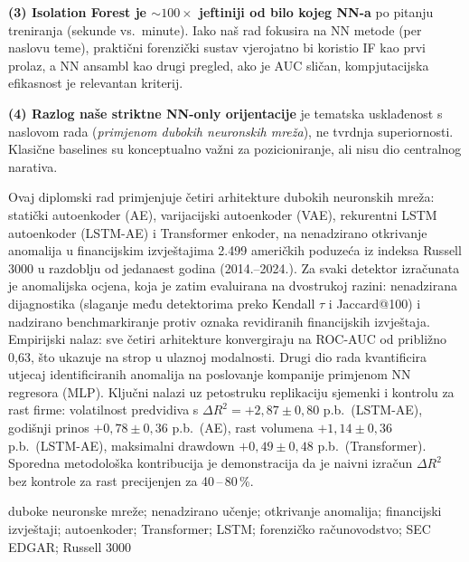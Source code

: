 \documentclass[diplomskirad,authoryear]{fer}
\begin{document}
\textbf{(3) Isolation Forest je $\sim 100\times$ jeftiniji od bilo kojeg NN-a} po pitanju treniranja (sekunde vs.\ minute). Iako naš rad fokusira na NN metode (per naslovu teme), praktični forenzički sustav vjerojatno bi koristio IF kao prvi prolaz, a NN ansambl kao drugi pregled, ako je AUC sličan, kompjutacijska efikasnost je relevantan kriterij.

\textbf{(4) Razlog naše striktne NN-only orijentacije} je tematska usklađenost s naslovom rada (\emph{primjenom dubokih neuronskih mreža}), ne tvrdnja superiornosti. Klasične baselines su konceptualno važni za pozicioniranje, ali nisu dio centralnog narativa.






\begin{sazetak}
Ovaj diplomski rad primjenjuje četiri arhitekture dubokih neuronskih mreža: statički autoenkoder (AE), varijacijski autoenkoder (VAE), rekurentni LSTM autoenkoder (LSTM-AE) i Transformer enkoder, na nenadzirano otkrivanje anomalija u financijskim izvještajima 2.499 američkih poduzeća iz indeksa Russell 3000 u razdoblju od jedanaest godina (2014.--2024.). Za svaki detektor izračunata je anomalijska ocjena, koja je zatim evaluirana na dvostrukoj razini: nenadzirana dijagnostika (slaganje među detektorima preko Kendall $\tau$ i Jaccard@100) i nadzirano benchmarkiranje protiv oznaka revidiranih financijskih izvještaja. Empirijski nalaz: sve četiri arhitekture konvergiraju na ROC-AUC od približno 0,63, što ukazuje na strop u ulaznoj modalnosti. Drugi dio rada kvantificira utjecaj identificiranih anomalija na poslovanje kompanije primjenom NN regresora (MLP). Ključni nalazi uz petostruku replikaciju sjemenki i kontrolu za rast firme: volatilnost predvidiva s $\Delta R^2 = +2{,}87 \pm 0{,}80$ p.b.\ (LSTM-AE), godišnji prinos $+0{,}78 \pm 0{,}36$ p.b.\ (AE), rast volumena $+1{,}14 \pm 0{,}36$ p.b.\ (LSTM-AE), maksimalni drawdown $+0{,}49 \pm 0{,}48$ p.b.\ (Transformer). Sporedna metodološka kontribucija je demonstracija da je naivni izračun $\Delta R^2$ bez kontrole za rast precijenjen za 40\,--\,80\,\%.
\end{sazetak}

\begin{kljucnerijeci}
duboke neuronske mreže; nenadzirano učenje; otkrivanje anomalija; financijski izvještaji; autoenkoder; Transformer; LSTM; forenzičko računovodstvo; SEC EDGAR; Russell 3000
\end{kljucnerijeci}
\end{document}
